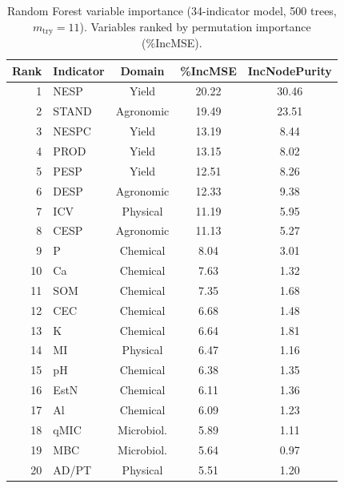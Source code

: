 \documentclass[12pt]{article}
\begin{document}
\begin{table}[ht]
\end{table}

\clearpage
\begin{table}[ht]
\centering
\caption{Random Forest variable importance (34-indicator model, 500 trees, $m_{\text{try}} = 11$). Variables ranked by permutation importance (\%IncMSE).}\label{tab:s4_rf}
\begin{tabular}{rlccc}
\toprule
Rank & Indicator & Domain & \%IncMSE & IncNodePurity \\
\midrule
1  & NESP  & Yield        & 20.22 & 30.46 \\
2  & STAND & Agronomic    & 19.49 & 23.51 \\
3  & NESPC & Yield        & 13.19 & 8.44 \\
4  & PROD  & Yield        & 13.15 & 8.02 \\
5  & PESP  & Yield        & 12.51 & 8.26 \\
6  & DESP  & Agronomic    & 12.33 & 9.38 \\
7  & ICV   & Physical     & 11.19 & 5.95 \\
8  & CESP  & Agronomic    & 11.13 & 5.27 \\
9  & P     & Chemical     & 8.04 & 3.01 \\
10 & Ca    & Chemical     & 7.63 & 1.32 \\
11 & SOM   & Chemical     & 7.35 & 1.68 \\
12 & CEC   & Chemical     & 6.68 & 1.48 \\
13 & K     & Chemical     & 6.64 & 1.81 \\
14 & MI    & Physical     & 6.47 & 1.16 \\
15 & pH    & Chemical     & 6.38 & 1.35 \\
16 & EstN  & Chemical     & 6.11 & 1.36 \\
17 & Al    & Chemical     & 6.09 & 1.23 \\
18 & qMIC  & Microbiol.   & 5.89 & 1.11 \\
19 & MBC   & Microbiol.   & 5.64 & 0.97 \\
20 & AD/PT & Physical     & 5.51 & 1.20 \\

\end{tabular}
\end{table}
\end{document}

